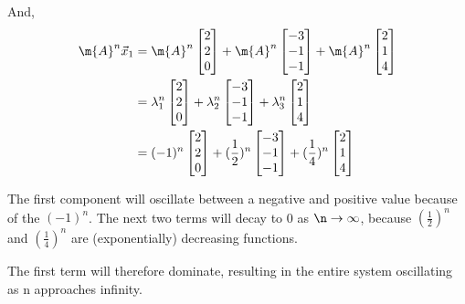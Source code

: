\begin{enumerate}[label=(\alph*)]
{    And, 
    \begin{align*}
    \m{A}^n\vec{x}_1 &= \m{A}^n \begin{bmatrix}2 \\ 2 \\ 0\end{bmatrix} + \m{A}^n \begin{bmatrix}-3 \\ -1 \\ -1\end{bmatrix} + \m{A}^n \begin{bmatrix}2 \\ 1 \\ 4\end{bmatrix} \\
    &= \lambda_1^n \begin{bmatrix}2 \\ 2 \\ 0\end{bmatrix} + \lambda_2^n \begin{bmatrix}-3 \\ -1 \\ -1\end{bmatrix} + \lambda_3^n \begin{bmatrix}2 \\ 1 \\ 4\end{bmatrix} \\
    &= (-1)^n \begin{bmatrix}2 \\ 2 \\ 0\end{bmatrix} + (\frac{1}{2})^n \begin{bmatrix}-3 \\ -1 \\ -1\end{bmatrix} + (\frac{1}{4})^n \begin{bmatrix}2 \\ 1 \\ 4\end{bmatrix} \\
    \end{align*}
    
    The first component will oscillate between a negative and positive value because of the $(-1)^n$. The next two terms will decay to 0 as $\n\to\infty$, because $(\frac{1}{2})^n$ and $(\frac{1}{4})^n$ are (exponentially) decreasing functions.
    
    The first term will therefore dominate, resulting in the entire system oscillating as n approaches infinity.
    
}
\end{enumerate}
